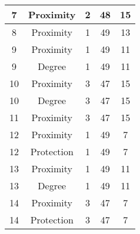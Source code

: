 \documentclass[results.tex]{subfiles}
\begin{document}
\begin{center}
\begin{tabular}{| c || c | c | c | c |}
            \hline
            7                       & Proximity                    & 2                      & 48                      & 15                   \\
            \hline
            8                       & Proximity                    & 1                      & 49                      & 13                   \\
            \hline
            9                       & Proximity                    & 1                      & 49                      & 11                   \\
            \hline
            9                       & Degree                       & 1                      & 49                      & 11                   \\
            \hline
            10                      & Proximity                    & 3                      & 47                      & 15                   \\
            \hline
            10                      & Degree                       & 3                      & 47                      & 15                   \\
            \hline
            11                      & Proximity                    & 3                      & 47                      & 15                   \\
            \hline
            12                      & Proximity                    & 1                      & 49                      & 7                    \\
            \hline
            12                      & Protection                   & 1                      & 49                      & 7                    \\
            \hline
            13                      & Proximity                    & 1                      & 49                      & 11                   \\
            \hline
            13                      & Degree                       & 1                      & 49                      & 11                   \\
            \hline
            14                      & Proximity                    & 3                      & 47                      & 7                    \\
            \hline
            14                      & Protection                   & 3                      & 47                      & 7                    \\

\end{tabular}
\end{center}
\end{document}
